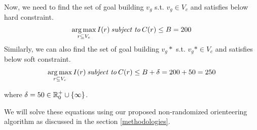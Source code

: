 Now, we need to find the set of goal building $v_g$ s.t. $v_g \in V_c$ and satisfies below hard constraint.
\begin{equation}
    \operatorname*{arg\,max}_{r \subseteq V_c}I(r) \:\textit{subject to}\:C(r) \leq B=200
\end{equation}
Similarly, we can also find the set of goal building $v_g*$ s.t. $v_g* \in V_c$ and satisfies below soft constraint.
\begin{gather}
     \operatorname*{arg\,max}_{r \subseteq V_c}I(r) \:\textit{subject to}\: C(r) \leq B+\delta = 200+50 = 250
\end{gather}

where $\delta = 50 \in \mathbb{R}_0^+ \cup \{\infty\}$.

We will solve these equations using our proposed non-randomized orienteering algorithm as discussed in the section \ref{methodologies}.



